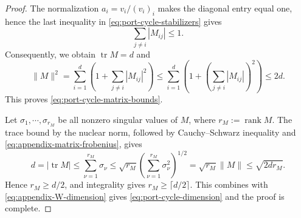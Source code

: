 \documentclass[11pt,reqno]{amsart}
\theoremstyle{definition}
\theoremstyle{plain}
\numberwithin{equation}{section}
\begin{document}
\begin{proof}
The normalization $a_i=v_i/(v_i)_i$ makes the diagonal entry equal one, hence the last inequality in \eqref{eq:port-cycle-stabilizers} gives
\begin{equation*}
    \sum_{j\neq i}|M_{ij}|\le 1.
\end{equation*}
Consequently, we obtain $\operatorname{tr}M=d$ and
\begin{equation}\label{eq:appendix-matrix-frobenius}
    \|M\|^2=\sum_{i=1}^d\left(1+\sum_{j\neq i}|M_{ij}|^2\right)\le \sum_{i=1}^d
    \left(
        1+
        \left(\sum_{j\neq i}|M_{ij}|\right)^2
    \right)
    \leq 2d.
\end{equation}
This proves \eqref{eq:port-cycle-matrix-bounds}. 

Let $\sigma_1,\cdots,\sigma_{r_M}$ be all nonzero singular values of $M$, where $r_M:=\operatorname{rank}M$. The trace bound by the nuclear norm, followed by Cauchy--Schwarz inequality and \eqref{eq:appendix-matrix-frobenius}, gives
\begin{equation*}
    d=|\operatorname{tr}M|\le \sum_{\nu=1}^{r_M}\sigma_\nu \le \sqrt{r_M}\left(\sum_{\nu=1}^{r_M}\sigma_\nu^2\right)^{1/2}=\sqrt{r_M}\|M\|\le \sqrt{2dr_M}.
\end{equation*}
Hence $r_M\ge d/2$, and integrality gives $r_M\ge \lceil d/2\rceil$. This combines with \eqref{eq:appendix-W-dimension} gives \eqref{eq:port-cycle-dimension} and the proof is complete.
\end{proof}
\end{document}
